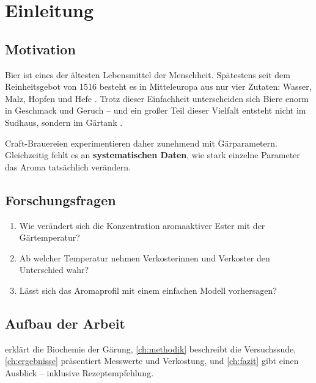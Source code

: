 \chapter{Einleitung}
\label{ch:einleitung}

\section{Motivation}
Bier ist eines der ältesten Lebensmittel der Menschheit. Spätestens seit dem
Reinheitsgebot von 1516 besteht es in Mitteleuropa aus nur vier Zutaten: Wasser,
Malz, Hopfen und Hefe \citep{hopfner2019reinheit}. Trotz dieser Einfachheit
unterscheiden sich Biere enorm in Geschmack und Geruch -- und ein großer Teil
dieser Vielfalt entsteht nicht im Sudhaus, sondern im Gärtank \citep{malz2021ester}.

Craft-Brauereien experimentieren daher zunehmend mit Gärparametern. Gleichzeitig
fehlt es an \textbf{systematischen Daten}, wie stark einzelne Parameter das
Aroma tatsächlich verändern.

\section{Forschungsfragen}
\begin{enumerate}[label=\textbf{F\arabic*}]
  \item Wie verändert sich die Konzentration aromaaktiver Ester mit der Gärtemperatur?
  \item Ab welcher Temperatur nehmen Verkosterinnen und Verkoster den Unterschied wahr?
  \item Lässt sich das Aromaprofil mit einem einfachen Modell vorhersagen?
\end{enumerate}

\section{Aufbau der Arbeit}
 erklärt die Biochemie der Gärung, \cref{ch:methodik}
beschreibt die Versuchssude, \cref{ch:ergebnisse} präsentiert Messwerte und
Verkostung, und \cref{ch:fazit} gibt einen Ausblick -- inklusive Rezeptempfehlung.
